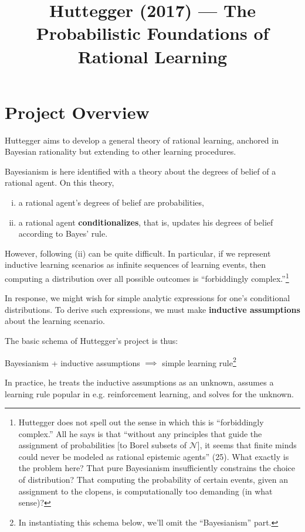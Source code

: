 \documentclass{my-tufte}
\title{Huttegger (2017) --- The Probabilistic Foundations of Rational Learning}
\begin{document}
\maketitle

\section{Project Overview}

Huttegger aims to develop a general theory of rational learning, anchored in Bayesian rationality but extending to other learning procedures.

Bayesianism is here identified with a theory about the degrees of belief of a rational agent. On this theory, 
\begin{enumerate}[(i)]
	\item a rational agent's degrees of belief are probabilities,
	\item a rational agent \textbf{conditionalizes}, that is, updates his degrees of belief according to Bayes' rule.
\end{enumerate}
However, following (ii) can be quite difficult. In particular, if we represent inductive learning scenarios as infinite sequences of learning events, then computing a distribution over all possible outcomes is ``forbiddingly complex.''\footnote{Huttegger does not spell out the sense in which this is ``forbiddingly complex.'' All he says is that ``without any principles that guide the assignment of probabilities [to Borel subsets of $\mathcal N$], it seems that finite minds could never be modeled as rational epistemic agents'' (25). What exactly is the problem here? That pure Bayesianism insufficiently constrains the choice of distribution? That computing the probability of certain events, given an assignment to the clopens, is computationally too demanding (in what sense)?}

In response, we might wish for simple analytic expressions for one's conditional distributions. To derive such expressions, we must make \textbf{inductive assumptions} about the learning scenario.

The basic schema of Huttegger's project is thus:
\begin{center}
	Bayesianism + inductive assumptions $\implies$ simple learning rule\footnote{In instantiating this schema below, we'll omit the ``Bayesianism'' part.}
\end{center}
In practice, he treats the inductive assumptions as an unknown, assumes a learning rule popular in e.g. reinforcement learning, and solves for the unknown.
\end{document}
